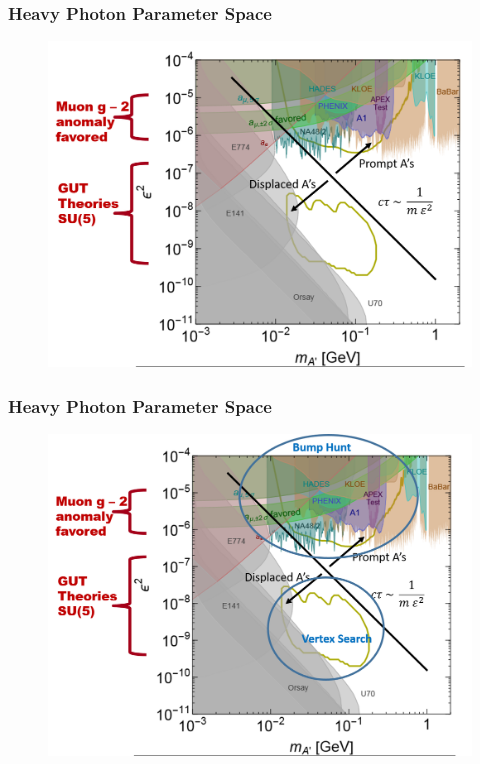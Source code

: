 \documentclass{beamer}
\begin{document}
\begin{frame}
\frametitle{Heavy Photon Parameter Space}
\begin{figure}
\includegraphics[width=0.80\linewidth]{figs/reach3.png}
\end{figure}

\end{frame}


\begin{frame}
\frametitle{Heavy Photon Parameter Space}
\begin{figure}
\includegraphics[width=0.80\linewidth]{figs/reach4.png}
\end{figure}

\end{frame}

\end{document}
